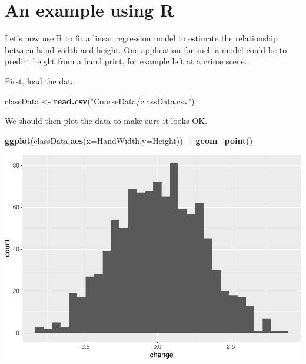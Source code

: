 \documentclass[
  a4paperpaper,
]{book}
\newenvironment{Shaded}{\begin{snugshade}}{\end{snugshade}}
\newcommand{\DataTypeTok}[1]{\textcolor[rgb]{0.13,0.29,0.53}{#1}}
\newcommand{\KeywordTok}[1]{\textcolor[rgb]{0.13,0.29,0.53}{\textbf{#1}}}
\newcommand{\NormalTok}[1]{#1}
\newcommand{\OperatorTok}[1]{\textcolor[rgb]{0.81,0.36,0.00}{\textbf{#1}}}
\newcommand{\StringTok}[1]{\textcolor[rgb]{0.31,0.60,0.02}{#1}}
\begin{document}
\hypertarget{an-example-using-r}{%
\section{An example using R}\label{an-example-using-r}}

Let's now use R to fit a linear regression model to estimate the relationship between hand width and height. One application for such a model could be to predict height from a hand print, for example left at a crime scene.

First, load the data:

\begin{Shaded}
\begin{Highlighting}[]
\NormalTok{classData \textless{}{-}}\StringTok{ }\KeywordTok{read.csv}\NormalTok{(}\StringTok{"CourseData/classData.csv"}\NormalTok{)}
\end{Highlighting}
\end{Shaded}

We should then plot the data to make sure it looks OK.

\begin{Shaded}
\begin{Highlighting}[]
\KeywordTok{ggplot}\NormalTok{(classData,}\KeywordTok{aes}\NormalTok{(}\DataTypeTok{x=}\NormalTok{HandWidth,}\DataTypeTok{y=}\NormalTok{Height)) }\OperatorTok{+}\StringTok{ }
\StringTok{  }\KeywordTok{geom\_point}\NormalTok{()}
\end{Highlighting}
\end{Shaded}

\begin{center}\includegraphics{BB852_files/figure-latex/unnamed-chunk-211-1} \end{center}
\end{document}
